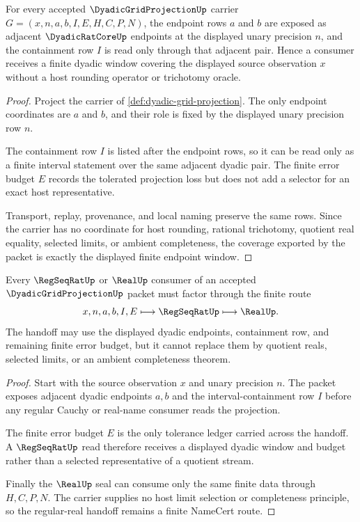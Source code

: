 \begin{theorem}
\label{thm:dyadic-grid-projection-endpoint-coverage}
For every accepted $\DyadicGridProjectionUp$ carrier $G=(x,n,a,b,I,E,H,C,P,N)$, the endpoint rows $a$ and $b$ are exposed as adjacent $\DyadicRatCoreUp$ endpoints at the displayed unary precision $n$, and the containment row $I$ is read only through that adjacent pair. Hence a consumer receives a finite dyadic window covering the displayed source observation $x$ without a host rounding operator or trichotomy oracle.
\end{theorem}
\begin{proof}
Project the carrier of \autoref{def:dyadic-grid-projection}. The only endpoint coordinates are $a$ and $b$, and their role is fixed by the displayed unary precision row $n$.

The containment row $I$ is listed after the endpoint rows, so it can be read only as a finite interval statement over the same adjacent dyadic pair. The finite error budget $E$ records the tolerated projection loss but does not add a selector for an exact host representative.

Transport, replay, provenance, and local naming preserve the same rows. Since the carrier has no coordinate for host rounding, rational trichotomy, quotient real equality, selected limits, or ambient completeness, the coverage exported by the packet is exactly the displayed finite endpoint window.
\end{proof}

\begin{theorem}
\label{thm:dyadic-grid-projection-regseqrat-real-handoff}
Every $\RegSeqRatUp$ or $\RealUp$ consumer of an accepted $\DyadicGridProjectionUp$ packet must factor through the finite route
$$
x,n,a,b,I,E \longmapsto \RegSeqRatUp \longmapsto \RealUp .
$$
The handoff may use the displayed dyadic endpoints, containment row, and remaining finite error budget, but it cannot replace them by quotient reals, selected limits, or an ambient completeness theorem.
\end{theorem}
\begin{proof}
Start with the source observation $x$ and unary precision $n$. The packet exposes adjacent dyadic endpoints $a,b$ and the interval-containment row $I$ before any regular Cauchy or real-name consumer reads the projection.

The finite error budget $E$ is the only tolerance ledger carried across the handoff. A $\RegSeqRatUp$ read therefore receives a displayed dyadic window and budget rather than a selected representative of a quotient stream.

Finally the $\RealUp$ seal can consume only the same finite data through $H,C,P,N$. The carrier supplies no host limit selection or completeness principle, so the regular-real handoff remains a finite NameCert route.
\end{proof}


